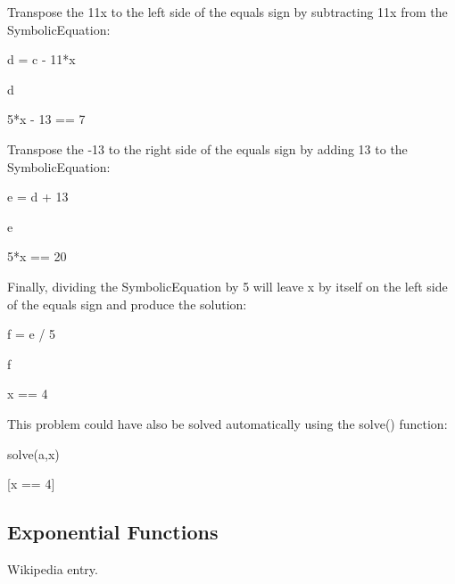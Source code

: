\documentclass[12pt,twoside]{book}
\begin{document}
\bigskip

{\textquotedbl}{\textquotedbl}{\textquotedbl}

Transpose the 11x to the left side of the equals sign by subtracting 11x
from the SymbolicEquation:

{\textquotedbl}{\textquotedbl}{\textquotedbl}

d = c {}- 11*x

d

{\textbar}

5*x {}- 13 == 7


\bigskip

{\textquotedbl}{\textquotedbl}{\textquotedbl}

Transpose the {}-13 to the right side of the equals sign by adding 13 to
the SymbolicEquation:

{\textquotedbl}{\textquotedbl}{\textquotedbl}

e = d + 13

e

{\textbar}

5*x == 20


\bigskip

{\textquotedbl}{\textquotedbl}{\textquotedbl}

Finally, dividing the SymbolicEquation by 5 will leave x by itself on
the left side of the equals sign and produce the solution:

{\textquotedbl}{\textquotedbl}{\textquotedbl}

f = e / 5

f

{\textbar}

x == 4


\bigskip

{\textquotedbl}{\textquotedbl}{\textquotedbl}

This problem could have also be solved automatically using the solve()
function:

{\textquotedbl}{\textquotedbl}{\textquotedbl}

solve(a,x)

{\textbar}

[x == 4]


\bigskip


\bigskip

\subsection[Exponential Functions]{Exponential
Functions}
Wikipedia entry.
\end{document}
